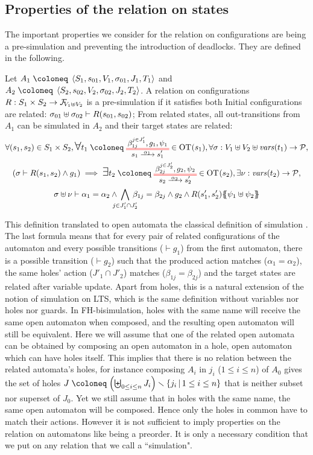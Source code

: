\documentclass{article}
\begin{document}
\subsection{Properties of the relation on states}
The important properties we consider for the relation on configurations are being a pre-simulation and preventing the introduction of deadlocks.
They are defined in the following.
\begin{defi}
Let \(A_1 \defobject \OAg[1]\) and \(A_2 \defobject \OAg[2]\).
A relation on configurations \(R: S_1 \times S_2 \to \rformulas[V_1 \uplus V_2]\) is a pre-simulation if it satisfies both
 Initial configurations are related: \(\sigma_{01} \uplus \sigma_{02} \vdash R\mpar{s_{01}, s_{02}}\);
 From related states, all out-transitions from \(A_1\) can be simulated in \(A_2\) and their target states are related:
\begin{multline*}
	\forall \mpar{s_1, s_2} \in S_1 \times S_2, \bigsymb{\forall} t_1 \defobject \OTx{1}{}{1}{1} \in \fOT{s_1}, \forall \sigma: V_1 \uplus V_2 \uplus \fvars{t_1} \to \values, \\
	\mpar{\sigma \vdash R\mpar{s_1, s_2} \wedge g_1} \implies \bigsymb{\exists} t_2 \defobject \OTx{2}{}{2}{2} \in \fOT{s_2}, \exists \nu: \fvars{t_2} \to \values, \\
	\sigma \uplus \nu \vdash \alpha_1 = \alpha_2 \wedge \bigwedge_\subbox{j \in J'_1 \cap J'_2} \beta_{1j} = \beta_{2j} \wedge g_2 \wedge R\mpar{s'_1, s'_2}\psubst{\psi_1 \uplus \psi_2}
\end{multline*}
\end{defi}
This definition translated to open automata the classical definition of simulation \cite{10.1007/3-540-54430-5_78}.
The last formula means that for every pair of related configurations of the automaton and every possible transitions (\(\vdash g_1\)) from the first automaton, there is a possible transition (\(\vdash g_2\)) such that the produced action matches (\(\alpha_1 = \alpha_2\)), the same holes' action (\(J'_1 \cap J'_2\)) matches (\(\beta_{1j} = \beta_{2j}\)) and the target states are related after variable update. %
Apart from holes, this is a natural extension of the notion of simulation on LTS, which is the same definition without variables nor holes nor guards.
In FH-bisimulation, holes with the same name will receive the same open automaton when composed, and the resulting open automaton will still be equivalent.
Here we will assume that one of the related open automata can be obtained by composing an open automaton in a hole, open automaton which can have holes itself.
This implies that there is no relation between the related automata's holes, for instance composing \(A_i\) in \(j_i\) (\(1 \leq i \leq n\)) of \(A_0\) gives the set of holes \(J \defobject \mpar{\biguplus_{0 \leq i \leq n} J_i} \setminus \mset{j_i}{1 \leq i \leq n}\) that is neither subset nor superset of \(J_0\).
Yet we still assume that in holes with the same name, the same open automaton will be composed.
Hence only the holes in common have to match their actions.
However it is not sufficient to imply properties on the relation on automatons like being a preorder.
It is only a necessary condition that we put on any relation that we call a ``simulation".
\end{document}
